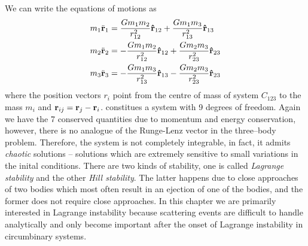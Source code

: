 \documentclass[ twoside,openright,titlepage,numbers=noenddot,headinclude,%
                footinclude=true,cleardoublepage=empty,abstractoff, %
                BCOR=5mm,paper=a4,fontsize=11pt,%
                american,%
                ]{scrreprt}
\begin{document}
We can write the equations of motions as
\begin{equation}
\begin{aligned}
    m_1\ddot{\boldsymbol{\mathbf{r}}}_1&= \frac{Gm_1m_2}{r^2_{12}} \boldsymbol{\mathbf{\hat r}}_{12}+
    \frac{Gm_1m_3}{r^2_{13}} \boldsymbol{\mathbf{\hat r}}_{13}\\
    m_2\ddot{\boldsymbol{\mathbf{r}}}_2&= -\frac{Gm_1m_2}{r^2_{12}} \boldsymbol{\mathbf{\hat r}}_{12}+
    \frac{Gm_2m_3}{r^2_{23}} \boldsymbol{\mathbf{\hat r}}_{23}\\
    m_3\ddot{\boldsymbol{\mathbf{r}}}_3&= -\frac{Gm_1m_3}{r^2_{13}} \boldsymbol{\mathbf{\hat r}}_{13}-
    \frac{Gm_2m_3}{r^2_{23}} \boldsymbol{\mathbf{\hat r}}_{23}
\label{eq:three_body_newton}
\end{aligned}
\end{equation}
where the position vectors $r_i$ point from the centre of mass of 
system $C_{123}$ to the mass $m_i$ and $\boldsymbol{\mathbf{r}}_{ij}=\boldsymbol{\mathbf{r}}_j-\boldsymbol{\mathbf{r}}_i$. 
 constitues a system with 9 degrees of freedom.
Again we have the 7 conserved quantities due to momentum and energy 
conservation, however, there is no analogue of the Runge-Lenz vector
in the three--body problem. Therefore, the system is not completely
integrable, in fact, it admits \emph{chaotic} solutions -- solutions which
are extremely sensitive to small variations in the inital conditions. 
There are two kinds of stability, one is called \emph{Lagrange stability} 
and the other \emph{Hill stability}. The latter happens due to close
approaches of two bodies which most often result in an ejection of one
of the bodies, and the former does not require close approaches.
In this chapter we are primarily interested in Lagrange instability 
because scattering events are difficult to handle analytically
and only become important after the onset of Lagrange instability in 
circumbinary systems. 
\end{document}
